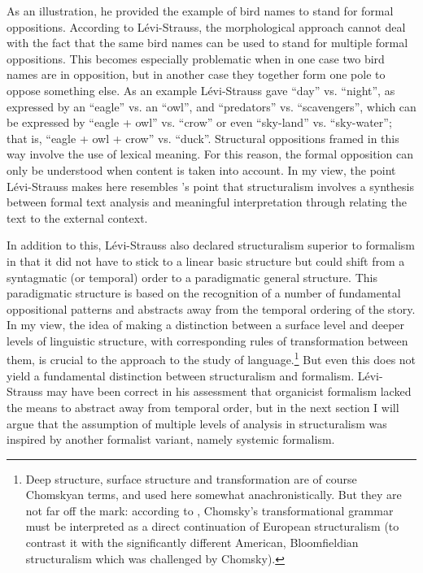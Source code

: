 \documentclass[output=paper]{langscibook}
\begin{document}
As an illustration, he provided the example of bird names to stand for formal oppositions. According to Lévi-Strauss, the morphological approach cannot deal with the fact that the same bird names can be used to stand for multiple formal oppositions. This becomes especially problematic when in one case two bird names are in opposition, but in another case they together form one pole to oppose something else. As an example Lévi-Strauss gave ``day'' vs. ``night'', as expressed by an ``eagle'' vs. an ``owl'', and ``predators'' vs. ``scavengers'', which can be expressed by ``eagle + owl'' vs. ``crow'' or even ``sky-land'' vs. ``sky-water''; that is, ``eagle + owl + crow'' vs. ``duck''. Structural oppositions framed in this way involve the use of lexical meaning. For this reason, the formal opposition can only be understood when content is taken into account. In my view, the point Lévi-Strauss makes here resembles {\Mukarovsky}'s point that structuralism involves a synthesis between formal text analysis and meaningful interpretation through relating the text to the external context.

In addition to this, Lévi-Strauss also declared structuralism superior to formalism in that it did not have to stick to a linear basic structure but could shift from a syntagmatic (or temporal) order to a paradigmatic general structure. This paradigmatic structure is based on the recognition of a number of fundamental oppositional patterns and abstracts away from the temporal ordering of the story. In my view, the idea of making a distinction between a surface level and deeper levels of linguistic structure, with corresponding rules of transformation between them, is crucial to the  approach to the study of language.\footnote{Deep structure, surface structure and transformation are of course Chomskyan terms, and used here somewhat anachronistically. But they are not far off the mark: according to \citet[1899--1900]{Joseph2001}, Chomsky's transformational grammar must be interpreted as a direct continuation of European structuralism (to contrast it with the significantly different American, Bloomfieldian structuralism which was challenged by Chomsky).} But even this does not yield a fundamental distinction between structuralism and formalism. Lévi-Strauss may have been correct in his assessment that organicist formalism lacked the means to abstract away from temporal order, but in the next section I will argue that the assumption of multiple levels of analysis in structuralism was inspired by another formalist variant, namely systemic formalism. 
\end{document}
